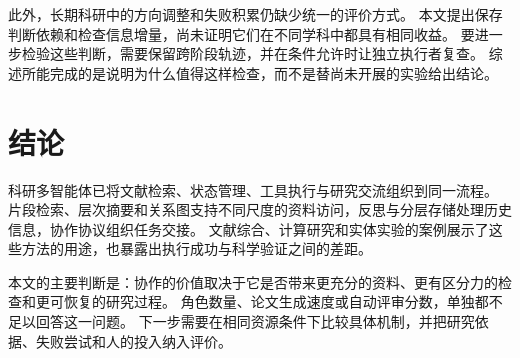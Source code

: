 此外，长期科研中的方向调整和失败积累仍缺少统一的评价方式。
本文提出保存判断依赖和检查信息增量，尚未证明它们在不同学科中都具有相同收益。
要进一步检验这些判断，需要保留跨阶段轨迹，并在条件允许时让独立执行者复查。
综述所能完成的是说明为什么值得这样检查，而不是替尚未开展的实验给出结论。

\section{结论}
科研多智能体已将文献检索、状态管理、工具执行与研究交流组织到同一流程。
片段检索、层次摘要和关系图支持不同尺度的资料访问，反思与分层存储处理历史信息，协作协议组织任务交接。
文献综合、计算研究和实体实验的案例展示了这些方法的用途，也暴露出执行成功与科学验证之间的差距。

本文的主要判断是：协作的价值取决于它是否带来更充分的资料、更有区分力的检查和更可恢复的研究过程。
角色数量、论文生成速度或自动评审分数，单独都不足以回答这一问题。
下一步需要在相同资源条件下比较具体机制，并把研究依据、失败尝试和人的投入纳入评价。
